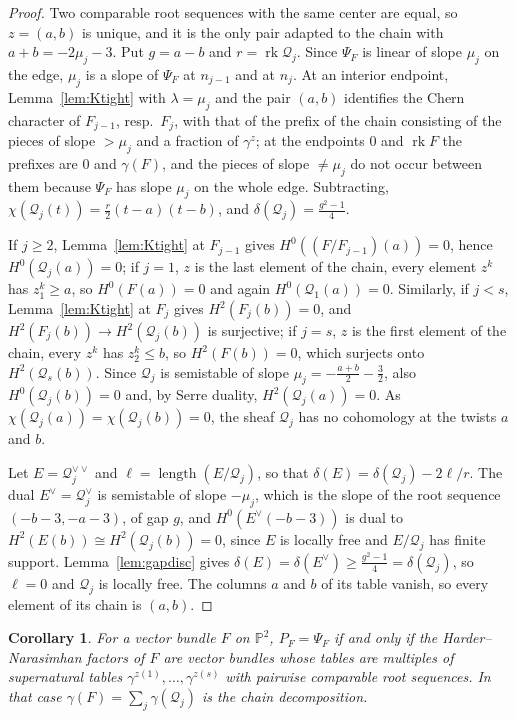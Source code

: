 \documentclass[11pt]{amsart}
\newtheorem{corollary}[theorem]{Corollary}
\theoremstyle{definition}
\theoremstyle{remark}
\newcommand{\PP}{\mathbb{P}}
\newcommand{\cQ}{\mathcal{Q}}
\DeclareMathOperator{\rk}{rk}
\begin{document}
\begin{proof}
Two comparable root sequences with the same center are equal, so $z=(a,b)$ is unique, and it is the only pair adapted to the chain with $a+b=-2\mu_j-3$. Put $g=a-b$ and $r=\rk\cQ_j$. Since $\Psi_F$ is linear of slope $\mu_j$ on the edge, $\mu_j$ is a slope of $\Psi_F$ at $n_{j-1}$ and at $n_j$. At an interior endpoint, Lemma~\ref{lem:Ktight} with $\lambda=\mu_j$ and the pair $(a,b)$ identifies the Chern character of $F_{j-1}$, resp.\ $F_j$, with that of the prefix of the chain consisting of the pieces of slope $>\mu_j$ and a fraction of $\gamma^z$; at the endpoints $0$ and $\rk F$ the prefixes are $0$ and $\gamma(F)$, and the pieces of slope $\ne\mu_j$ do not occur between them because $\Psi_F$ has slope $\mu_j$ on the whole edge. Subtracting, $\chi(\cQ_j(t))=\frac r2(t-a)(t-b)$, and $\delta(\cQ_j)=\frac{g^2-1}4$.

If $j\ge2$, Lemma~\ref{lem:Ktight} at $F_{j-1}$ gives $H^0((F/F_{j-1})(a))=0$, hence $H^0(\cQ_j(a))=0$; if $j=1$, $z$ is the last element of the chain, every element $z^k$ has $z^k_1\ge a$, so $H^0(F(a))=0$ and again $H^0(\cQ_1(a))=0$. Similarly, if $j<s$, Lemma~\ref{lem:Ktight} at $F_j$ gives $H^2(F_j(b))=0$, and $H^2(F_j(b))\to H^2(\cQ_j(b))$ is surjective; if $j=s$, $z$ is the first element of the chain, every $z^k$ has $z^k_2\le b$, so $H^2(F(b))=0$, which surjects onto $H^2(\cQ_s(b))$. Since $\cQ_j$ is semistable of slope $\mu_j=-\frac{a+b}2-\frac32$, also $H^0(\cQ_j(b))=0$ and, by Serre duality, $H^2(\cQ_j(a))=0$. As $\chi(\cQ_j(a))=\chi(\cQ_j(b))=0$, the sheaf $\cQ_j$ has no cohomology at the twists $a$ and $b$.

Let $E=\cQ_j^{\vee\vee}$ and $\ell=\operatorname{length}(E/\cQ_j)$, so that $\delta(E)=\delta(\cQ_j)-2\ell/r$. The dual $E^\vee=\cQ_j^\vee$ is semistable of slope $-\mu_j$, which is the slope of the root sequence $(-b-3,-a-3)$, of gap $g$, and $H^0(E^\vee(-b-3))$ is dual to $H^2(E(b))\cong H^2(\cQ_j(b))=0$, since $E$ is locally free and $E/\cQ_j$ has finite support. Lemma~\ref{lem:gapdisc} gives $\delta(E)=\delta(E^\vee)\ge\frac{g^2-1}4=\delta(\cQ_j)$, so $\ell=0$ and $\cQ_j$ is locally free. The columns $a$ and $b$ of its table vanish, so every element of its chain is $(a,b)$.
\end{proof}

\begin{corollary}\label{cor:equalityP2}
For a vector bundle $F$ on $\PP^2$, $P_F=\Psi_F$ if and only if the Harder--Narasimhan factors of $F$ are vector bundles whose tables are multiples of supernatural tables $\gamma^{z(1)},\dots,\gamma^{z(s)}$ with pairwise comparable root sequences. In that case $\gamma(F)=\sum_j\gamma(\cQ_j)$ is the chain decomposition.
\end{corollary}
\end{document}
